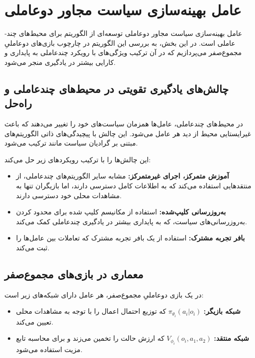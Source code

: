 \section{عامل بهینه‌سازی سیاست مجاور دو‌عاملی}\label{sec:MAPPO}

عامل بهینه‌سازی سیاست مجاور دو­عاملی
توسعه‌ای از الگوریتم  برای محیط‌های چند­عاملی است. در این بخش، به بررسی این الگوریتم در چارچوب بازی‌های دو­عاملیِ مجموع­‌صفر می‌پردازیم که در آن ترکیب ویژگی‌های  با رویکرد چند­عاملی به پایداری و کارایی بیشتر در یادگیری منجر می‌شود.

\subsection{چالش‌های یادگیری تقویتی در محیط‌های چند­عاملی و راه‌حل }

در محیط‌های چند­عاملی، عامل‌ها همزمان سیاست‌های خود را تغییر می‌دهند که باعث غیرایستایی محیط از دید هر عامل می‌شود. این چالش با پیچیدگی‌های ذاتی الگوریتم‌های مبتنی بر گرادیان سیاست مانند  ترکیب می‌شود.

 این چالش‌ها را با ترکیب رویکردهای زیر حل می‌کند:
\begin{itemize}
    \item \textbf{آموزش متمرکز، اجرای غیرمتمرکز:} مشابه سایر الگوریتم‌های چندعاملی، از منتقدهایی استفاده می‌کند که به اطلاعات کامل دسترسی دارند، اما بازیگران تنها به مشاهدات محلی خود دسترسی دارند.
    \item \textbf{به‌روزرسانی کلیپ‌شده:} استفاده از مکانیسم کلیپ شده  برای محدود کردن به‌روزرسانی‌های سیاست، که به پایداری بیشتر در یادگیری چند‌عاملی کمک می‌کند.
    \item \textbf{بافر تجربه مشترک:} استفاده از یک بافر تجربه مشترک که تعاملات بین عامل‌ها را ثبت می‌کند.
\end{itemize}

\subsection{معماری  در بازی‌های مجموع­‌صفر}

در یک بازی دو­عاملیِ مجموع­‌صفر، هر عامل دارای شبکه‌های زیر است:

\begin{itemize}
    \item \textbf{شبکه بازیگر:} $\pi_{\theta_i}(a_i|o_i)$ که توزیع احتمال اعمال را با توجه به مشاهدات محلی تعیین می‌کند.
    \item \textbf{شبکه منتقد:} $V_{\phi_i}(o_i, a_1, a_2)$ که ارزش حالت را تخمین می‌زند و برای محاسبه تابع مزیت استفاده می‌شود.
\end{itemize}

